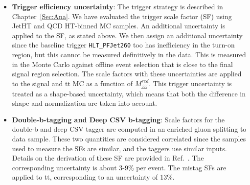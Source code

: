 \begin{itemize}
\item \textbf{Trigger efficiency uncertainty}: The trigger strategy is described in Chapter~\ref{Sec:Ana}. We have evaluated the trigger scale factor (SF) using JetHT and QCD HT-binned MC samples. An additional uncertainty is applied to the SF, as stated above. We then assign an additional uncertainty since the baseline trigger \texttt{HLT\_PFJet260} too has inefficiency in the turn-on region, but this cannot be measured definitively in the data. This is measured in the Monte Carlo against offline event selection that is close to the final signal region selection. The scale factors with these uncertainties are applied to the signal and tt MC as a function of $M_{jjj}^{red}$. This trigger uncertainty is treated as a shape-based uncertainty, which means that both the difference in shape and normalization are taken into account.
  
\item \textbf{Double-b-tagging and Deep CSV b-tagging}: Scale factors for the double-b and deep CSV tagger are computed in an enriched gluon splitting to \bbbar data sample. These two quantities are considered correlated since the samples used to measure the SFs are similar, and the taggers use similar inputs. Details on the derivation of these SF are provided in Ref.~\cite{DoubleBSFTWiki}. The corresponding uncertainty is about 3-9\% per event. The mistag SFs are applied to tt, corresponding to an uncertainty of 13\%.



\end{itemize}
